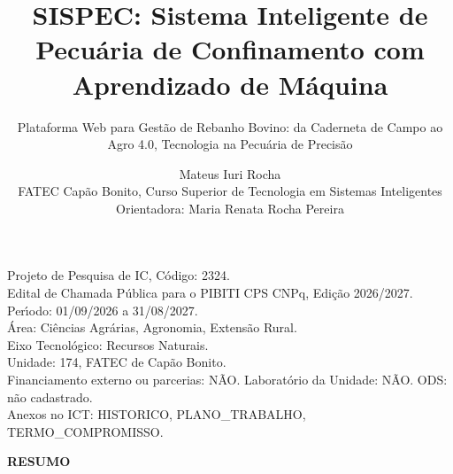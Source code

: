 \documentclass[12pt,a4paper]{article}
\title{SISPEC: Sistema Inteligente de Pecu\'aria de Confinamento com Aprendizado de M\'aquina}
\subtitle{Plataforma Web para Gest\~ao de Rebanho Bovino: da Caderneta de Campo ao Agro 4.0, Tecnologia na Pecu\'aria de Precis\~ao}
\author{Mateus Iuri Rocha\\ FATEC Cap\~ao Bonito, Curso Superior de Tecnologia em Sistemas Inteligentes\\ Orientadora: Maria Renata Rocha Pereira}
\date{}
\begin{document}
\maketitle

\noindent Projeto de Pesquisa de IC, C\'odigo: 2324.\\
Edital de Chamada P\'ublica para o PIBITI CPS CNPq, Edi\c c\~ao 2026/2027.\\
Per\'{\i}odo: 01/09/2026 a 31/08/2027.\\
\'Area: Ci\^encias Agr\'arias, Agronomia, Extens\~ao Rural.\\
Eixo Tecnol\'ogico: Recursos Naturais.\\
Unidade: 174, FATEC de Cap\~ao Bonito.\\
Financiamento externo ou parcerias: N\~AO. Laborat\'orio da Unidade: N\~AO. ODS: n\~ao cadastrado.\\
Anexos no ICT: HISTORICO, PLANO\_TRABALHO, TERMO\_COMPROMISSO.

\begin{center}
\textbf{RESUMO}
\end{center}
\end{document}
